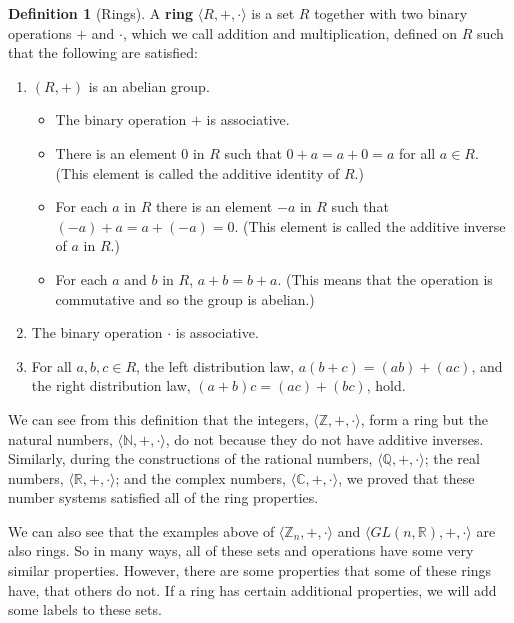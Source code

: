 \documentclass[
]{book}
\providecommand{\tightlist}{%
  \setlength{\itemsep}{0pt}\setlength{\parskip}{0pt}}
\theoremstyle{definition}
\newtheorem{definition}{Definition}[chapter]
\theoremstyle{definition}
\theoremstyle{definition}
\theoremstyle{remark}
\begin{document}
\begin{definition}[Rings]
\protect\hypertarget{def:unnamed-chunk-167}{}{\label{def:unnamed-chunk-167} {} }A \textbf{ring} \(\langle R,+,\cdot \rangle\) is a set \(R\) together with two binary operations \(+\) and \(\cdot\), which we call addition and multiplication, defined on \(R\) such that the following are satisfied:

\begin{enumerate}
\def\labelenumi{\arabic{enumi}.}
\tightlist
\item
  \(\left( R,+\right)\) is an abelian group.

  \begin{itemize}
  \tightlist
  \item
    The binary operation \(+\) is associative.
  \item
    There is an element \(0\) in \(R\) such that \(0+a=a+0=a\) for all \(a\in R\). (This element is called the additive identity of \(R\).)
  \item
    For each \(a\) in \(R\) there is an element \(-a\) in \(R\) such that \((-a)+a=a+(-a)=0\). (This element is called the additive inverse of \(a\) in \(R\).)
  \item
    For each \(a\) and \(b\) in \(R\), \(a+b=b+a\). (This means that the operation is commutative and so the group is abelian.)
  \end{itemize}
\item
  The binary operation \(\cdot\) is associative.
\item
  For all \(a,b,c\in R\), the left distribution law, \(a(b+c)=(ab)+(ac)\), and the right distribution law, \((a+b)c=(ac)+(bc)\), hold.
\end{enumerate}
\end{definition}

We can see from this definition that the integers, \(\langle\mathbb{Z},+,\cdot\rangle\), form a ring but the natural numbers, \(\langle\mathbb{N},+,\cdot\rangle\), do not because they do not have additive inverses. Similarly, during the constructions of the rational numbers, \(\langle\mathbb{Q},+,\cdot\rangle\); the real numbers, \(\langle\mathbb{R},+,\cdot\rangle\); and the complex numbers, \(\langle\mathbb{C},+,\cdot\rangle\), we proved that these number systems satisfied all of the ring properties.

We can also see that the examples above of \(\langle\mathbb{Z}_n,+,\cdot\rangle\) and \(\langle GL(n,\mathbb{R}),+,\cdot\rangle\) are also rings. So in many ways, all of these sets and operations have some very similar properties. However, there are some properties that some of these rings have, that others do not. If a ring has certain additional properties, we will add some labels to these sets.
\end{document}
